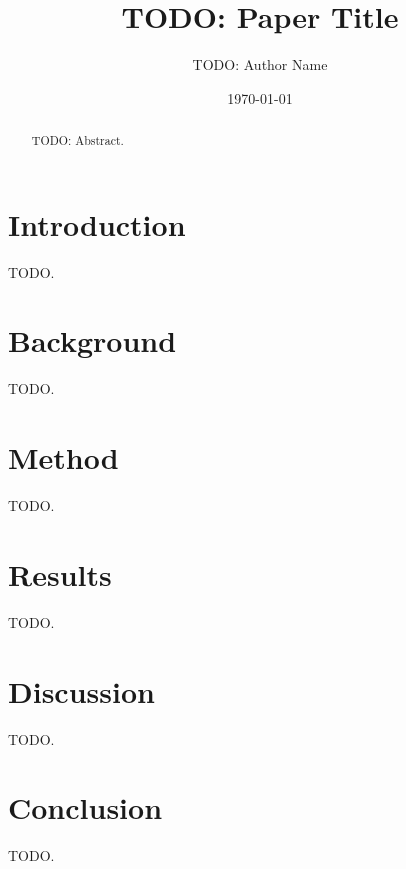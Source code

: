 \documentclass{article}
\title{TODO: Paper Title}
\author{TODO: Author Name}
\date{\today}
\begin{document}
\maketitle

\begin{abstract}
TODO: Abstract.
\end{abstract}

\section{Introduction}
TODO.

\section{Background}
TODO.

\section{Method}
TODO.

\section{Results}
TODO.

\section{Discussion}
TODO.

\section{Conclusion}
TODO.



\end{document}
